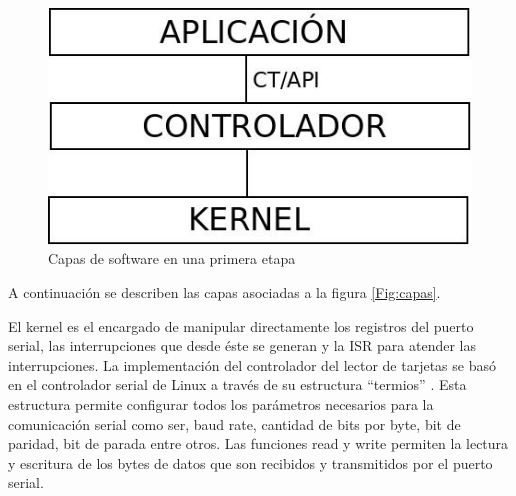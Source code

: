 \begin{figure}[H]
\centering
  \begin{center}
  \includegraphics[scale=.4]{Imagenes/SW_sc2.jpg} 
  \end{center}
  \caption{Capas de software en una primera etapa}\label{Fig:capas0} 
\end{figure}

\bigskip
A continuación se describen las capas asociadas a la figura \ref{Fig:capas}.

\bigskip
{}
El kernel es el encargado de manipular directamente los registros del puerto serial, las interrupciones que desde éste se generan y la ISR para atender las interrupciones.
La implementación del controlador del lector de tarjetas se basó en el controlador serial de Linux a través de su estructura “termios” \cite{termios}. Esta estructura permite configurar todos los parámetros necesarios para la comunicación serial como ser, baud rate, cantidad de bits por byte, bit de paridad, bit de parada entre otros. Las funciones read y write permiten la lectura y escritura de los bytes de datos que son recibidos y transmitidos por el puerto serial.

